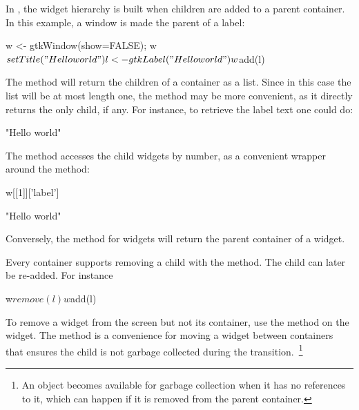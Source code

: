 In \GTK{}, the widget hierarchy is built
when children are added to a parent container.  In this example, a
window is made the parent of a label:
\begin{Schunk}
\begin{Sinput}
 w <- gtkWindow(show=FALSE); w$setTitle("Hello world")
 l <- gtkLabel("Hello world")
 w$add(l)
\end{Sinput}
\end{Schunk}

The method  will return the children
of a container as a list. Since in this case the list will be at most
length one, the  method may be more
convenient, as it directly returns the only child, if any. For
instance, to retrieve the label text one could do:
\begin{Schunk}
\begin{Soutput}
[1] "Hello world"
\end{Soutput}
\end{Schunk}
The \method{[[}{GObject} method 
accesses the child widgets by number, as a convenient wrapper
around the  method:
\begin{Schunk}
\begin{Sinput}
 w[[1]]['label']
\end{Sinput}
\begin{Soutput}
[1] "Hello world"
\end{Soutput}
\end{Schunk}
%
Conversely, the  method for \GTK\/ widgets will
return the parent container of a widget.

Every container supports removing a child with the
 method. The child can later be re-added.
For instance
\begin{Schunk}
\begin{Sinput}
 w$remove(l)
 w$add(l)
\end{Sinput}
\end{Schunk}
% 
To remove a widget from the screen but not its container, use the
 method on the widget. The
 method is a convenience for moving a
widget between containers that ensures the child is not garbage
collected during the transition.~\footnote{An object becomes available
  for garbage collection when it has no references to it, which can
  happen if it is removed from the parent container.}

